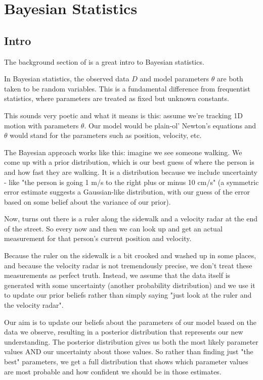 \chapter{Bayesian Statistics}

\section{Intro}

The background section of \cite{maclaurin2016thesis} is a great intro to Bayesian statistics.

In Bayesian statistics, the observed data $D$ and model parameters $\theta$ are both taken to be random
variables.
This is a fundamental difference from frequentist statistics, where parameters are treated as fixed
but unknown constants.


This sounds very poetic and what it means is this: assume we're tracking 1D motion with parameters
$\theta$. Our model would be plain-ol' Newton's equations and $\theta$ would stand for the parameters
such as position, velocity, etc.

The Bayesian approach works like this: imagine we see someone walking.
We come up with a prior distribution, which is our best guess of where the person is and how fast
they are walking.
It is a distribution because we include uncertainty - like "the person is going 1 m/s to the right plus
or minus 10 cm/s" (a symmetric error estimate suggests a Gaussian-like distribution,
with our guess of the error based on some belief about the variance of our prior).
 
Now, turns out there is a ruler along the sidewalk and a velocity radar at the end of the street.
So every now and then we can look up and get an actual measurement for that person's
current position and velocity.


Because the ruler on the sidewalk is a bit crooked and washed up in some places,
and because the velocity radar is not tremendously precise,
we don't treat these measurements as perfect truth.
Instead, we assume that the data itself is generated with some uncertainty
(another probability distribution) and we use it to update our prior beliefs rather than
simply saying "just look at the ruler and the velocity radar".


Our aim is to update our beliefs about the parameters of our model based on the data we observe,
resulting in a posterior distribution that represents our new understanding.
The posterior distribution gives us both the most likely parameter values AND
our uncertainty about those values. So rather than finding just "the best" parameters,
we get a full distribution that shows which parameter values are most probable and
how confident we should be in those estimates.
\\~\\


